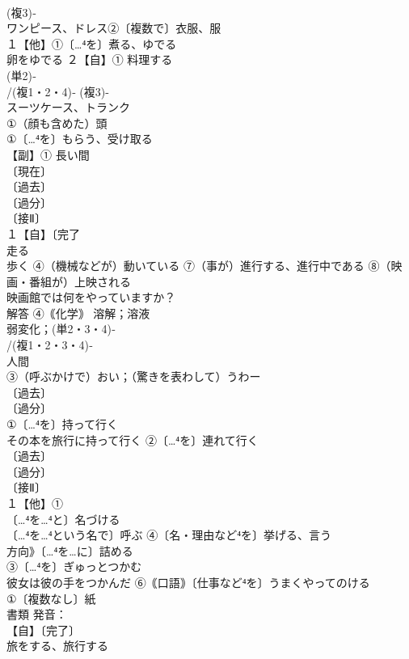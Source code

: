 \documentclass[8pt]{extreport}
\begin{document}
\begin{CJK}{UTF8}{min}
\\	(複3)‐
\\	ワンピース、ドレス②〔複数で〕衣服、服
\\	１【他】①〔…⁴を〕煮る、ゆでる 
\\	卵をゆでる ２【自】① 料理する 
\\	(単2)‐
\\	/(複1・2・4)‐ (複3)‐
\\	スーツケース、トランク
\\	①（顔も含めた）頭
\\	①〔…⁴を〕もらう、受け取る
\\	【副】① 長い間
\\	〔現在〕
\\	〔過去〕
\\	〔過分〕
\\	〔接Ⅱ〕
\\	１【自】〔完了
\\	走る
\\	歩く ④（機械などが）動いている ⑦（事が）進行する、進行中である ⑧（映画・番組が）上映される 
\\	映画館では何をやっていますか？
\\	解答 ④｟化学｠ 溶解；溶液
\\	弱変化；(単2・3・4)‐
\\	/(複1・2・3・4)‐
\\	人間
\\	③（呼ぶかけで）おい；（驚きを表わして）うわー
\\	〔過去〕
\\	〔過分〕
\\	①〔…⁴を〕持って行く 
\\	その本を旅行に持って行く ②〔…⁴を〕連れて行く
\\	〔過去〕
\\	〔過分〕
\\	〔接Ⅱ〕
\\	１【他】①
\\	〔…⁴を…⁴と〕名づける
\\	〔…⁴を…⁴という名で〕呼ぶ ④〔名・理由など⁴を〕挙げる、言う 
\\	方向》〔…⁴を…に〕詰める
\\	③〔…⁴を〕ぎゅっとつかむ 
\\	彼女は彼の手をつかんだ ⑥｟口語｠〔仕事など⁴を〕うまくやってのける
\\	①〔複数なし〕紙 
\\	書類 発音：
\\	【自】〔完了〕
\\	旅をする、旅行する 

\end{CJK}
\end{document}
